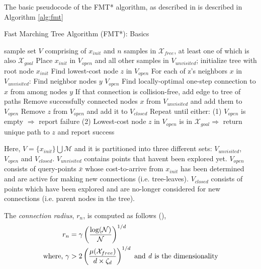 \documentclass{article}
\begin{document}
The basic pseudocode of the FMT* algorithm, as described in \cite{FMT} is described in Algorithm \ref{alg:fmt}

\begin{algorithm}
\caption{Fast Marching Tree Algorithm (FMT*): Basics}\label{alg:fmt}
	\begin{algorithmic}[1]
		\Require sample set $V$ comprising of $x_{init}$ and $n$ samples in $\mathcal{X}_{free}$, at least one of which is also $\mathcal{X}_{goal}$
		\State Place $x_{init}$ in $V_{open}$ and all other samples in $V_{unvisited}$; initialize tree with root node $x_{init}$
		\State Find lowest-cost node $z$ in $V_{open}$
		\State \quad For each of z's neighbors $x$ in $V_{unvisited}$:
		\State \quad\quad Find neighbor nodes $y$ $V_{open}$
		\State \quad\quad Find locally-optimal one-step connection to $x$ from among nodes $y$
		\State \quad\quad If that connection is collision-free, add edge to tree of paths
		\State \quad Remove successfully connected nodes $x$ from $V_{unvisited}$ and add them to $V_{open}$
		\State \quad Remove $z$ from $V_{open}$ and add it to $V_{closed}$
		\State \quad Repeat until either:
		\State \quad\quad (1) $V_{open}$ is empty $\Rightarrow$ report failure
		\State \quad\quad (2) Lowest-cost node $z$ in $V_{open}$ is in $\mathcal{X}_{goal} \Rightarrow$ return unique path to $z$ and
		\State \quad\quad\quad report success
	\end{algorithmic}
\end{algorithm}

Here, $V = \{x_{init}\} \bigcup \mathcal{M}$ and it is partitioned into three different sets: $V_{unvisited}$, $V_{open}$ and $V_{closed}$. $V_{unvisited}$ contains points that havent been explored yet. $V_{open}$ consists of query-points $\bar{x}$ whose cost-to-arrive from $x_{init}$ has been determined and are active for making new connections (i.e. tree-leaves). $V_{closed}$ consists of points which have been explored and are no-longer considered for new connections (i.e. parent nodes in the tree).

The \textit{connection radius}, $r_n$, is computed as follows (\cite{FMT}),
\begin{align}
	r_n &= \gamma \left( \frac{\log(\mathcal{N})}{\mathcal{N}} \right)^{1/d} \notag \\
	\text{where, } \gamma &> 2 \left( \frac{\mu(\mathcal{X}_{free})}{d \times \zeta_d} \right)^{1/d} \text{ and \textit{d} is the dimensionality} \notag
\end{align}
\end{document}
